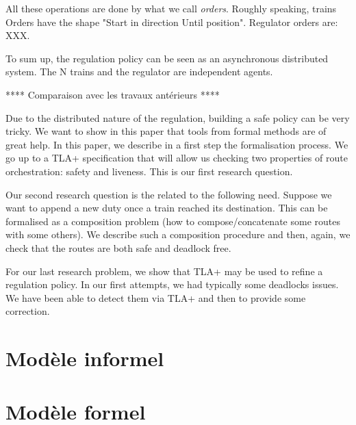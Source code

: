 \documentclass[runningheads]{llncs}
\begin{document}
 All these operations are done by what we call  \emph{orders}. Roughly speaking, trains Orders have the shape "Start in direction Until position". Regulator orders are: XXX. 
 
 
 To sum up, the regulation policy can be seen as an asynchronous distributed system. The N trains and the regulator are independent agents.
 
 
 **** Comparaison avec les travaux antérieurs ****
 
 
Due to the distributed nature of the regulation, building a safe policy can be very tricky. We want to show in this paper that tools from formal methods are of great help.  In this paper, we describe in  a first step the formalisation process. We go up to a TLA+ specification that will allow us checking two properties of route orchestration: safety and liveness. This is our first research question. 

Our second research question is the related to the following need. Suppose we want to append a new duty once a train reached its destination. This can be formalised as a composition problem (how to compose/concatenate some routes with some others). We describe such a composition procedure and then, again, we check that the routes are both safe and deadlock free. 

For our last research problem, we show that TLA+ may be used to refine a regulation policy. In our first attempts, we had typically some deadlocks issues. We have been able to detect them via TLA+ and then to provide some correction. 

 
\newpage
 
 





\section{Modèle informel}
\label{sec:informal-model}



\section{Modèle formel}
\label{sec:formal-model}
\end{document}
